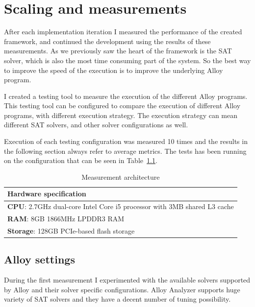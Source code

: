 \chapter{Scaling and measurements}
\label{cha:measurements}

After each implementation iteration I measured the performance of the created framework, and continued the development using the results of these measurements. As we previously saw the heart of the framework is the SAT solver, which is also the most time consuming part of the system. So the best way to improve the speed of the execution is to improve the underlying Alloy program.

I created a testing tool to measure the execution of the different Alloy programs. This testing tool can be configured to compare the execution of different Alloy programs, with different execution strategy. The execution strategy can mean different SAT solvers, and other solver configurations as well.

Execution of each testing configuration was measured 10 times and the results in the following section always refer to average metrics. The tests has been running on the configuration that can be seen in Table~\ref{tab:hardwarespecification}.

\begin{table}[htb]
\begin{center}
\begin{tabular}{|l|}
\hline
	\textbf{Hardware specification}\\\hline
	\textbf{CPU}: 2.7GHz dual-core Intel Core i5 processor with 3MB shared L3 cache\\
	\textbf{RAM}: 8GB 1866MHz LPDDR3 RAM\\
	\textbf{Storage}: 128GB PCIe-based flash storage\\
\hline
\end{tabular}
\end{center}
\caption{\label{tab:hardwarespecification} Measurement architecture}
\end{table}

\section{Alloy settings}
\label{sec:alloysettings}

During the first measurement I experimented with the available solvers supported by Alloy and their solver specific configurations. Alloy Analyzer supports huge variety of SAT solvers and they have a decent number of tuning possibility.

